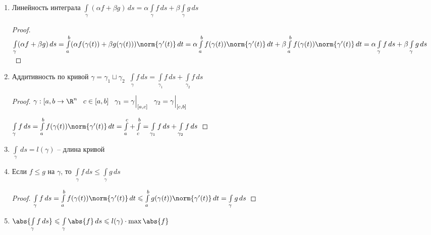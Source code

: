 \begin{properties}
\begin{enumerate}[1.]
		\item
		Линейность интеграла $\int\limits_{\gamma} (\alpha f + \beta g) \,ds = \alpha \int\limits_{\gamma} f \,ds + \beta \int\limits_{\gamma} g \,ds$
		
		\begin{proof}\thmslashn
			
			$\int\limits_{\gamma} (\alpha f + \beta g) \,ds = \int\limits_{a}^{b} (\alpha f(\gamma(t)) + \beta g(\gamma(t)) ) \norm{\gamma'(t)} \,dt = \alpha \int\limits_{a}^{b} f(\gamma(t)) \norm{\gamma'(t)} \,dt + \beta \int\limits_{a}^{b} f(\gamma(t)) \norm{\gamma'(t)} \,dt = \alpha \int\limits_{\gamma} f \,ds + \beta \int\limits_{\gamma} g \,ds$
	
		\end{proof}

		\item 
		Аддитивность по кривой $\gamma = \gamma_1 \sqcup \gamma_2 \;\; \int\limits_{\gamma} f\,ds = \int\limits_{\gamma_1} f\,ds + \int\limits_{\gamma_2} f\,ds$
		
		\begin{proof}\thmslashn
			
			$\gamma:[a,b \to \R^n \;\;\; c\in [a, b] \;\;\; \gamma_1 = \gamma\Big|_{[a, c]}\;\;\;\gamma_2 = \gamma\Big|_{[c, b]}$
			
			$\int\limits_{\gamma} f\,ds = \int\limits_{a}^{b} f(\gamma(t)) \norm{\gamma'(t)} \,dt = \int\limits_{a}^{c} + \int\limits_{c}^{b} = \int\limits_{\gamma_1} f\,ds + \int\limits_{\gamma_2} f\,ds $
			
		\end{proof}

		\item
		$\int\limits_{\gamma}\,ds = l(\gamma)$ -- длина кривой
		
		\item
		Если $f \leqslant g$ на $\gamma$, то $\int\limits_{\gamma} f\,ds \leqslant \int\limits_{\gamma}g\,ds$
		
		
		\begin{proof}\thmslashn
			
			$\int\limits_{\gamma} f\,ds = \int\limits_{a}^{b} f(\gamma(t)) \norm{\gamma'(t)} \,dt \leqslant \int\limits_{a}^{b} g(\gamma(t)) \norm{\gamma'(t)} \,dt = \int\limits_{\gamma} g\,ds$
			
		\end{proof}
	
		\item
		$\abs{\int\limits_{\gamma} f\,ds} \leqslant \int\limits_{\gamma}\abs{f}\,ds \leqslant l(\gamma) \cdot \max\abs{f}$
	

\end{enumerate}
\end{properties}
